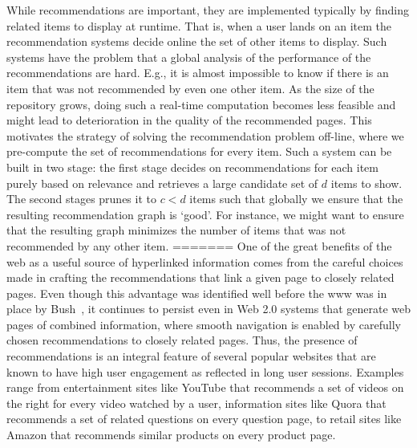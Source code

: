 While recommendations are important, they are implemented typically by finding
related items to display at runtime. That is, when a user lands on an item the
recommendation systems decide online the set of other items to display. Such
systems have the problem that a global analysis of the performance of the
recommendations are hard. E.g., it is almost impossible to know if there is an
item that was not recommended by even one other item. As the size of the
repository grows, doing such a real-time computation becomes less feasible and
might lead to deterioration in the quality of the recommended pages.  This
motivates the strategy of solving the recommendation problem off-line, where we
pre-compute the set of recommendations for every item. Such a system can be
built in two stage: the first stage decides on recommendations for each item
purely based on relevance and retrieves a large candidate set of $d$ items to
show. The second stages prunes it to $c < d$ items such that globally we ensure
that the resulting recommendation graph is `good'. For instance, we might want
to ensure that the resulting graph minimizes the number of items that was not
recommended by any other item. \vs
=======
One of the great benefits of the web as a useful source of hyperlinked
information comes from the careful choices made in crafting the recommendations
that link a given page to closely related pages. Even though this advantage was
identified well before the www was in place by Bush~\cite{Bush45}, it continues
to persist even in Web 2.0 systems that generate web pages of combined
information, where smooth navigation is enabled by carefully chosen
recommendations to closely related pages. Thus, the presence of recommendations
is an integral feature of several popular websites that are known to have high
user engagement as reflected in long user sessions. Examples range from 
entertainment sites like YouTube that recommends a set of videos on the right
for every video watched by a user, information sites like Quora that recommends
a set of related questions on every question page, to retail sites like Amazon
that recommends similar products on every product page. \vs

